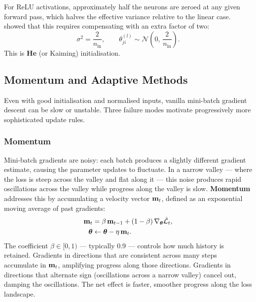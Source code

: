 For ReLU activations, approximately half the neurons are zeroed at any given forward pass, which halves the effective variance relative to the linear case. \textcite{he2015delving} showed that this requires compensating with an extra factor of two:
\begin{equation}
    \sigma^2 = \frac{2}{n_{\text{in}}},
    \qquad
    \theta^{(l)}_{ji} \sim \mathcal{N}\!\left(0,\, \frac{2}{n_{\text{in}}}\right).
\end{equation}
This is \textbf{He} (or Kaiming) initialisation.

\subsection{Momentum and Adaptive Methods}

Even with good initialisation and normalised inputs, vanilla mini-batch gradient descent can be slow or unstable. Three failure modes motivate progressively more sophisticated update rules.

\subsubsection{Momentum}

Mini-batch gradients are noisy: each batch produces a slightly different gradient estimate, causing the parameter updates to fluctuate. In a narrow valley — where the loss is steep across the valley and flat along it — this noise produces rapid oscillations across the valley while progress along the valley is slow. \textbf{Momentum} addresses this by accumulating a velocity vector $\mathbf{m}_t$, defined as an exponential moving average of past gradients:
\begin{align}
    \mathbf{m}_t &= \beta\, \mathbf{m}_{t-1} + (1-\beta)\, \nabla_{\boldsymbol{\theta}} \hat{\mathcal{L}}_t, \label{eq:momentum_m}\\
    \boldsymbol{\theta} &\leftarrow \boldsymbol{\theta} - \eta\, \mathbf{m}_t. \label{eq:momentum_update}
\end{align}
The coefficient $\beta \in [0,1)$ — typically 0.9 — controls how much history is retained. Gradients in directions that are consistent across many steps accumulate in $\mathbf{m}_t$, amplifying progress along those directions. Gradients in directions that alternate sign (oscillations across a narrow valley) cancel out, damping the oscillations. The net effect is faster, smoother progress along the loss landscape.


